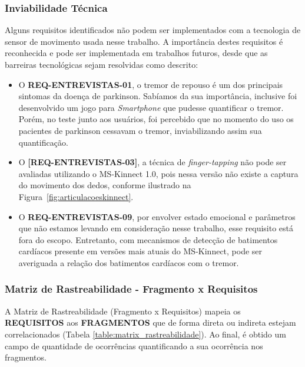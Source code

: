 \subsubsection{Inviabilidade Técnica}
Alguns requisitos identificados não podem ser implementados com a tecnologia de sensor de movimento usada nesse trabalho. A importância destes requisitos é reconhecida e pode ser implementada em trabalhos futuros, desde que as barreiras tecnológicas sejam resolvidas como descrito:
\begin{itemize}
  \item O \textbf{REQ-ENTREVISTAS-01}, o tremor de repouso é um dos principais sintomas da doença de parkinson. Sabíamos da sua importância, inclusive foi desenvolvido um jogo para \textit{Smartphone} que pudesse quantificar o tremor. Porém, no teste junto aos usuários, foi percebido que no momento do uso os pacientes de parkinson cessavam o tremor, inviabilizando assim sua quantificação. 
	\item O \textbf{[REQ-ENTREVISTAS-03]}, a técnica de \textit{finger-tapping} não pode ser avaliadas utilizando o MS-Kinnect 1.0, pois nessa versão não existe a captura do movimento dos dedos, conforme ilustrado na Figura~\ref{fig:articulacoeskinnect}.
	\item O \textbf{REQ-ENTREVISTAS-09}, por envolver estado emocional e parâmetros que não estamos levando em consideração nesse trabalho, esse requisito está fora do escopo. Entretanto, com mecanismos de detecção de batimentos cardíacos presente em versões mais atuais do MS-Kinnect, pode ser averiguada a relação dos batimentos cardíacos com o tremor.
\end{itemize}

\subsubsection{Matriz de Rastreabilidade - Fragmento x Requisitos}
A Matriz de Rastreabilidade (Fragmento x Requisitos) mapeia os \textbf{REQUISITOS} aos \textbf{FRAGMENTOS} que de forma direta ou indireta estejam correlacionados (Tabela \ref{table:matrix_rastreabilidade}). Ao final, é obtido um campo de quantidade de ocorrências quantificando a sua ocorrência nos fragmentos.

